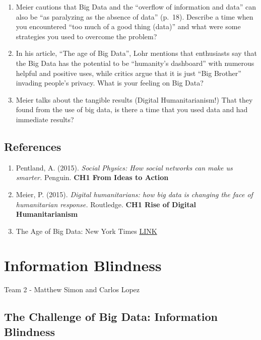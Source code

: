 \documentclass[]{book}
\providecommand{\tightlist}{%
  \setlength{\itemsep}{0pt}\setlength{\parskip}{0pt}}
\begin{document}
\begin{enumerate}
\def\labelenumi{\arabic{enumi}.}
\item
  Meier cautions that Big Data and the ``overflow of information and data'' can also be ``as paralyzing as the absence of data'' (p.~18). Describe a time when you encountered ``too much of a good thing (data)'' and what were some strategies you used to overcome the problem?
\item
  In his article, ``The age of Big Data'', Lohr mentions that enthusiasts say that the Big Data has the potential to be ``humanity's dashboard'' with numerous helpful and positive uses, while critics argue that it is just ``Big Brother'' invading people's privacy. What is your feeling on Big Data?
\item
  Meier talks about the tangible results (Digital Humanitarianism!) That they found from the use of big data, is there a time that you used data and had immediate results?
\end{enumerate}

\hypertarget{references}{%
\section{References}\label{references}}

\begin{enumerate}
\def\labelenumi{\arabic{enumi}.}
\tightlist
\item
  Pentland, A. (2015). \emph{Social Physics: How social networks can make us smarter.} Penguin. \textbf{CH1 From Ideas to Action}
\item
  Meier, P. (2015). \emph{Digital humanitarians: how big data is changing the face of humanitarian response.} Routledge. \textbf{CH1 Rise of Digital Humanitarianism}
\item
  The Age of Big Data: New York Times \href{https://www.nytimes.com/2012/02/12/sunday-review/big-datas-impact-in-the-world.html}{LINK}
\end{enumerate}

\hypertarget{information-blindness}{%
\chapter{Information Blindness}\label{information-blindness}}

Team 2 - Matthew Simon and Carlos Lopez

\hypertarget{the-challenge-of-big-data-information-blindness}{%
\section{The Challenge of Big Data: Information Blindness}\label{the-challenge-of-big-data-information-blindness}}
\end{document}
